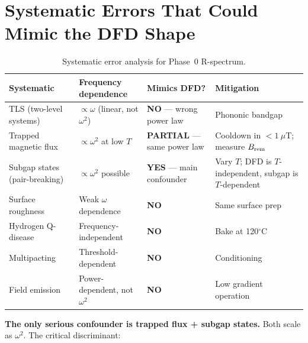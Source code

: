 \documentclass[11pt]{article}
\theoremstyle{definition}
\theoremstyle{remark}
\begin{document}
\section{Systematic Errors That Could Mimic the DFD Shape}

\begin{table}[H]
\centering
\caption{Systematic error analysis for Phase~0 R-spectrum.}
\label{tab:systematics}
\renewcommand{\arraystretch}{1.3}
\begin{tabular}{@{}p{3.2cm}p{3.5cm}p{3cm}p{2.8cm}@{}}
\toprule
\textbf{Systematic} & \textbf{Frequency dependence}
& \textbf{Mimics DFD?} & \textbf{Mitigation} \\
\midrule
\rowcolor{rowok}
TLS (two-level systems) & $\propto \omega$ (linear, not $\omega^2$)
& \textbf{NO} --- wrong power law & Phononic bandgap \\
\rowcolor{rowok}
Trapped magnetic flux & $\propto \omega^2$ at low $T$
& \textbf{PARTIAL} --- same power law & Cooldown in $<1~\mu$T;
  measure $B_{\rm rem}$ \\
\rowcolor{rowhi}
Subgap states (pair-breaking) & $\propto \omega^2$ possible
& \textbf{YES} --- main confounder & Vary $T$; DFD is $T$-independent,
  subgap is $T$-dependent \\
\rowcolor{rowok}
Surface roughness & Weak $\omega$ dependence
& \textbf{NO} & Same surface prep \\
\rowcolor{rowok}
Hydrogen Q-disease & Frequency-independent
& \textbf{NO} & Bake at 120$^\circ$C \\
\rowcolor{rowok}
Multipacting & Threshold-dependent
& \textbf{NO} & Conditioning \\
\rowcolor{rowok}
Field emission & Power-dependent, not $\omega^2$
& \textbf{NO} & Low gradient operation \\
\bottomrule
\end{tabular}
\end{table}

\textbf{The only serious confounder is trapped flux + subgap states.}
Both scale as $\omega^2$. The critical discriminant:
\end{document}
